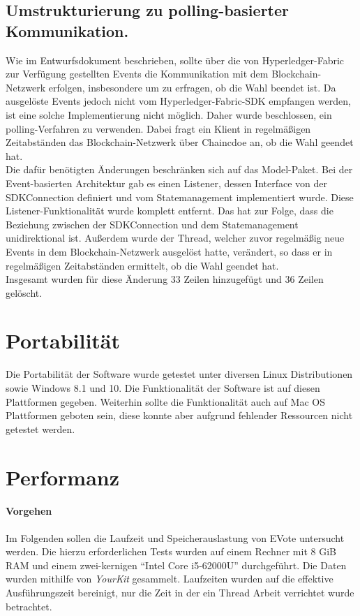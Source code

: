 \documentclass[parskip=full]{scrartcl}
\begin{document}
\subsection{Umstrukturierung zu polling-basierter Kommunikation.}
Wie im Entwurfsdokument beschrieben, sollte über die von Hyperledger-Fabric zur Verfügung gestellten Events die Kommunikation mit dem Blockchain-Netzwerk erfolgen, insbesondere um zu erfragen, ob die Wahl beendet ist. Da ausgelöste Events jedoch nicht vom Hyperledger-Fabric-SDK empfangen werden, ist eine solche Implementierung nicht möglich. Daher wurde beschlossen, ein polling-Verfahren zu verwenden. Dabei fragt ein Klient in regelmäßigen Zeitabständen das Blockchain-Netzwerk über Chaincdoe an, ob die Wahl geendet hat.
\\
Die dafür benötigten Änderungen beschränken sich auf das Model-Paket. Bei der Event-basierten Architektur gab es einen Listener, dessen Interface von der SDKConnection definiert und vom Statemanagement implementiert wurde. Diese Listener-Funktionalität wurde komplett entfernt. Das hat zur Folge, dass die Beziehung zwischen der SDKConnection und dem Statemanagement unidirektional ist. Außerdem wurde der Thread, welcher zuvor regelmäßig neue Events in dem Blockchain-Netzwerk ausgelöst hatte, verändert, so dass er in regelmäßigen Zeitabständen ermittelt, ob die Wahl geendet hat.
\\
Insgesamt wurden für diese Änderung 33 Zeilen hinzugefügt und 36 Zeilen gelöscht.

\section{Portabilität}
Die Portabilität der Software wurde getestet unter diversen Linux Distributionen sowie Windows 8.1 und 10.
Die Funktionalität der Software ist auf diesen Plattformen gegeben.
Weiterhin sollte die Funktionalität auch auf Mac OS Plattformen geboten sein, diese konnte aber aufgrund fehlender Ressourcen nicht getestet werden.
\newpage
\section{Performanz}
\paragraph{Vorgehen}
Im Folgenden sollen die Laufzeit und Speicherauslastung von EVote untersucht werden.
Die hierzu erforderlichen Tests wurden auf einem Rechner mit 8 GiB RAM und einem zwei-kernigen \enquote{Intel Core i5-62000U} durchgeführt. Die Daten wurden mithilfe von \textit{YourKit} gesammelt. Laufzeiten wurden auf die effektive Ausführungszeit bereinigt, nur die Zeit in der ein Thread Arbeit verrichtet wurde betrachtet.
\end{document}
